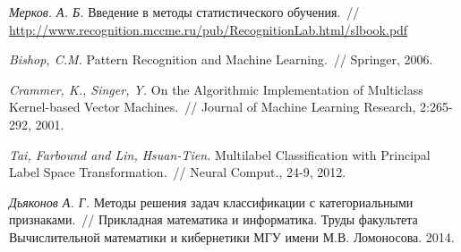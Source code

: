 \documentclass[12pt,fleqn]{article}
\begin{document}



\begin{thebibliography}{1}
    \emph{Мерков. А. Б.}
    Введение в методы статистического обучения.~//
    \url{http://www.recognition.mccme.ru/pub/RecognitionLab.html/slbook.pdf}

    \emph{Bishop, C.M.}
    Pattern Recognition and Machine Learning.~//
    Springer, 2006.

    \emph{Crammer, K., Singer, Y.}
    On the Algorithmic Implementation of Multiclass Kernel-based Vector Machines.~//
    Journal of Machine Learning Research, 2:265-292, 2001.

    \emph{Tai, Farbound and Lin, Hsuan-Tien.}
    Multilabel Classification with Principal Label Space Transformation.~//
    Neural Comput., 24-9, 2012.

    \emph{Дьяконов А. Г.}
    Методы решения задач классификации с категориальными признаками.~//
    Прикладная математика и информатика. Труды факультета Вычислительной математики и кибернетики МГУ имени М.В. Ломоносова. 2014.
\end{thebibliography}
\end{document}
